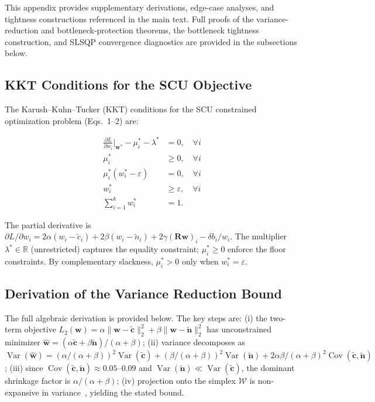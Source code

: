 \documentclass[a4paper,fleqn]{cas-sc}
\begin{document}
This appendix provides supplementary derivations, edge-case analyses, and tightness constructions referenced in the main text. Full proofs of the variance-reduction and bottleneck-protection theorems, the bottleneck tightness construction, and SLSQP convergence diagnostics are provided in the subsections below.

\subsection{KKT Conditions for the SCU Objective}
\label{app:kkt}

The Karush--Kuhn--Tucker (KKT) conditions for the SCU constrained optimization problem (Eqs.~1--2) are:

\begin{align}
\frac{\partial L}{\partial w_i}\bigg|_{\mathbf{w}^*} - \mu_i^* - \lambda^* &= 0, \quad \forall i \\
\mu_i^* &\ge 0, \quad \forall i \\
\mu_i^*(w_i^* - \varepsilon) &= 0, \quad \forall i \\
w_i^* &\ge \varepsilon, \quad \forall i \\
\sum_{i=1}^k w_i^* &= 1.
\end{align}

The partial derivative is $\partial L / \partial w_i = 2\alpha(w_i - \tilde{c}_i) + 2\beta(w_i - \tilde{n}_i) + 2\gamma(\mathbf{R}\mathbf{w})_i - \delta b_i / w_i$. The multiplier $\lambda^* \in \mathbb{R}$ (unrestricted) captures the equality constraint; $\mu_i^* \ge 0$ enforce the floor constraints. By complementary slackness, $\mu_i^* > 0$ only when $w_i^* = \varepsilon$.

\subsection{Derivation of the Variance Reduction Bound}
\label{app:variance-derivation}

The full algebraic derivation is provided below. The key steps are: (i) the two-term objective $L_2(\mathbf{w}) = \alpha\|\mathbf{w} - \tilde{\mathbf{c}}\|_2^2 + \beta\|\mathbf{w} - \tilde{\mathbf{n}}\|_2^2$ has unconstrained minimizer $\hat{\mathbf{w}} = (\alpha\tilde{\mathbf{c}} + \beta\tilde{\mathbf{n}})/(\alpha+\beta)$; (ii) variance decomposes as $\operatorname{Var}(\hat{\mathbf{w}}) = (\alpha/(\alpha+\beta))^2\operatorname{Var}(\tilde{\mathbf{c}}) + (\beta/(\alpha+\beta))^2\operatorname{Var}(\tilde{\mathbf{n}}) + 2\alpha\beta/(\alpha+\beta)^2\operatorname{Cov}(\tilde{\mathbf{c}}, \tilde{\mathbf{n}})$; (iii) since $\operatorname{Cov}(\tilde{\mathbf{c}}, \tilde{\mathbf{n}}) \approx 0.05$--$0.09$ and $\operatorname{Var}(\tilde{\mathbf{n}}) \ll \operatorname{Var}(\tilde{\mathbf{c}})$, the dominant shrinkage factor is $\alpha/(\alpha+\beta)$; (iv) projection onto the simplex $\mathcal{W}$ is non-expansive in variance~\cite{wang2013projection}, yielding the stated bound.
\end{document}
